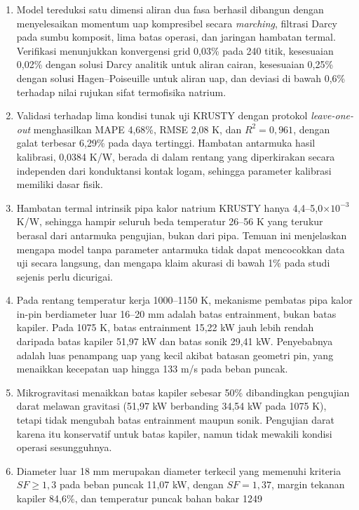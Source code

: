 \documentclass[
  indonesian,
  12pt,
  a4paper,
]{report}
\begin{document}
\begin{enumerate}
\def\labelenumi{\arabic{enumi}.}
\item
  Model tereduksi satu dimensi aliran dua fasa berhasil dibangun dengan
  menyelesaikan momentum uap kompresibel secara \emph{marching},
  filtrasi Darcy pada sumbu komposit, lima batas operasi, dan jaringan
  hambatan termal. Verifikasi menunjukkan konvergensi grid 0,03\% pada
  240 titik, kesesuaian 0,02\% dengan solusi Darcy analitik untuk aliran
  cairan, kesesuaian 0,25\% dengan solusi Hagen--Poiseuille untuk aliran
  uap, dan deviasi di bawah 0,6\% terhadap nilai rujukan sifat
  termofisika natrium.
\item
  Validasi terhadap lima kondisi tunak uji KRUSTY dengan protokol
  \emph{leave-one-out} menghasilkan MAPE 4,68\%, RMSE 2,08 K, dan
  \(R^{2} = 0{,}961\), dengan galat terbesar 6,29\% pada daya tertinggi.
  Hambatan antarmuka hasil kalibrasi, 0,0384 K/W, berada di dalam
  rentang yang diperkirakan secara independen dari konduktansi kontak
  logam, sehingga parameter kalibrasi memiliki dasar fisik.
\item
  Hambatan termal intrinsik pipa kalor natrium KRUSTY hanya
  4,4--5,0\(\times10^{-3}\) K/W, sehingga hampir seluruh beda temperatur
  26--56 K yang terukur berasal dari antarmuka pengujian, bukan dari
  pipa. Temuan ini menjelaskan mengapa model tanpa parameter antarmuka
  tidak dapat mencocokkan data uji secara langsung, dan mengapa klaim
  akurasi di bawah 1\% pada studi sejenis perlu dicurigai.
\item
  Pada rentang temperatur kerja 1000--1150 K, mekanisme pembatas pipa
  kalor in-pin berdiameter luar 16--20 mm adalah batas entrainment,
  bukan batas kapiler. Pada 1075 K, batas entrainment 15,22 kW jauh
  lebih rendah daripada batas kapiler 51,97 kW dan batas sonik 29,41 kW.
  Penyebabnya adalah luas penampang uap yang kecil akibat batasan
  geometri pin, yang menaikkan kecepatan uap hingga 133 m/s pada beban
  puncak.
\item
  Mikrogravitasi menaikkan batas kapiler sebesar 50\% dibandingkan
  pengujian darat melawan gravitasi (51,97 kW berbanding 34,54 kW pada
  1075 K), tetapi tidak mengubah batas entrainment maupun sonik.
  Pengujian darat karena itu konservatif untuk batas kapiler, namun
  tidak mewakili kondisi operasi sesungguhnya.
\item
  Diameter luar 18 mm merupakan diameter terkecil yang memenuhi kriteria
  \(SF \ge 1{,}3\) pada beban puncak 11,07 kW, dengan \(SF = 1{,}37\),
  margin tekanan kapiler 84,6\%, dan temperatur puncak bahan bakar 1249

\end{enumerate}
\end{document}
